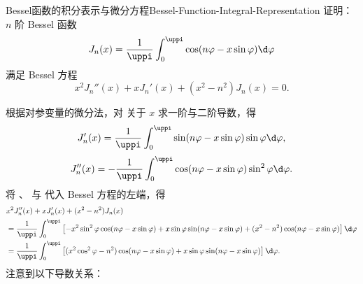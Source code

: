 \begin{problem}{Bessel函数的积分表示与微分方程}{Bessel-Function-Integral-Representation}
    证明：$n$ 阶 Bessel 函数
    \begin{equation}\label{eq:bessel-defn}
        J_n(x) = \frac{1}{\uppi} \int_0^{\uppi} \cos(n\varphi - x \sin \varphi) \d \varphi
    \end{equation}
    满足 Bessel 方程
    \begin{equation}\label{eq:bessel-eq}
        x^2 J_n''(x) + x J_n'(x) + (x^2 - n^2) J_n(x) = 0.
    \end{equation}
\end{problem}

\begin{myproof}
    根据对参变量的微分法，对  关于 $x$ 求一阶与二阶导数，得
    \begin{equation}\label{eq:bessel-diff1}
        J_n'(x) = \frac{1}{\uppi} \int_0^{\uppi} \sin(n\varphi - x \sin \varphi) \sin \varphi \d \varphi,
    \end{equation}
    \begin{equation}\label{eq:bessel-diff2}
        J_n''(x) = -\frac{1}{\uppi} \int_0^{\uppi} \cos(n\varphi - x \sin \varphi) \sin^2 \varphi \d \varphi.
    \end{equation}
    将 、 与  代入 Bessel 方程的左端，得
    \begin{equation}\label{eq:bessel-lhs}
        \begin{aligned}
             & x^2 J_n''(x) + x J_n'(x) + (x^2 - n^2) J_n(x)                                                                                                                                                                 \\
             & = \frac{1}{\uppi} \int_0^{\uppi} \left[ -x^2 \sin^2 \varphi \cos(n\varphi - x \sin \varphi) + x \sin \varphi \sin(n\varphi - x \sin \varphi) + (x^2 - n^2) \cos(n\varphi - x \sin \varphi) \right] \d \varphi \\
             & = \frac{1}{\uppi} \int_0^{\uppi} \left[ (x^2 \cos^2 \varphi - n^2) \cos(n\varphi - x \sin \varphi) + x \sin \varphi \sin(n\varphi - x \sin \varphi) \right] \d \varphi.
        \end{aligned}
    \end{equation}
    注意到以下导数关系：
    \begin{equation}\label{eq:bessel-total-deriv}
        \begin{aligned}

\end{aligned}
\end{equation}
\end{myproof}
